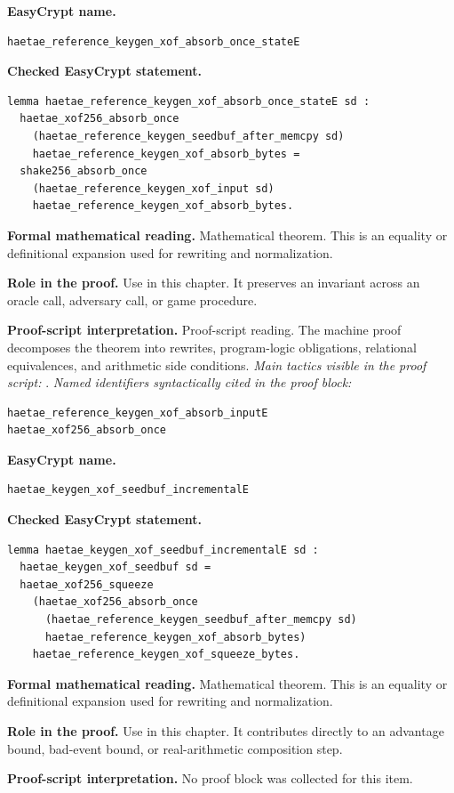 \begin{formaltheorem}
\noindent\textbf{EasyCrypt name.}
\begin{lstlisting}[language=EasyCrypt,basicstyle=\ttfamily\scriptsize]
haetae_reference_keygen_xof_absorb_once_stateE
\end{lstlisting}
\noindent\textbf{Checked EasyCrypt statement.}
\begin{lstlisting}[language=EasyCrypt,basicstyle=\ttfamily\scriptsize]
lemma haetae_reference_keygen_xof_absorb_once_stateE sd :
  haetae_xof256_absorb_once
    (haetae_reference_keygen_seedbuf_after_memcpy sd)
    haetae_reference_keygen_xof_absorb_bytes =
  shake256_absorb_once
    (haetae_reference_keygen_xof_input sd)
    haetae_reference_keygen_xof_absorb_bytes.
\end{lstlisting}
\noindent\textbf{Formal mathematical reading.}
Mathematical theorem. This is an equality or definitional expansion used for rewriting and normalization.

\noindent\textbf{Role in the proof.}
Use in this chapter. It preserves an invariant across an oracle call, adversary call, or game procedure.

\noindent\textbf{Proof-script interpretation.}
Proof-script reading. The machine proof decomposes the theorem into rewrites, program-logic obligations, relational equivalences, and arithmetic side conditions.
\emph{Main tactics visible in the proof script:} .
\emph{Named identifiers syntactically cited in the proof block:}
\begin{lstlisting}[language=EasyCrypt,basicstyle=\ttfamily\scriptsize]
haetae_reference_keygen_xof_absorb_inputE
haetae_xof256_absorb_once
\end{lstlisting}

\end{formaltheorem}

\begin{formaltheorem}
\noindent\textbf{EasyCrypt name.}
\begin{lstlisting}[language=EasyCrypt,basicstyle=\ttfamily\scriptsize]
haetae_keygen_xof_seedbuf_incrementalE
\end{lstlisting}
\noindent\textbf{Checked EasyCrypt statement.}
\begin{lstlisting}[language=EasyCrypt,basicstyle=\ttfamily\scriptsize]
lemma haetae_keygen_xof_seedbuf_incrementalE sd :
  haetae_keygen_xof_seedbuf sd =
  haetae_xof256_squeeze
    (haetae_xof256_absorb_once
      (haetae_reference_keygen_seedbuf_after_memcpy sd)
      haetae_reference_keygen_xof_absorb_bytes)
    haetae_reference_keygen_xof_squeeze_bytes.
\end{lstlisting}
\noindent\textbf{Formal mathematical reading.}
Mathematical theorem. This is an equality or definitional expansion used for rewriting and normalization.

\noindent\textbf{Role in the proof.}
Use in this chapter. It contributes directly to an advantage bound, bad-event bound, or real-arithmetic composition step.

\noindent\textbf{Proof-script interpretation.}
No proof block was collected for this item.

\end{formaltheorem}


